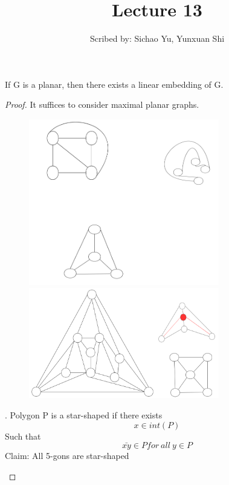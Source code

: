 \documentclass{article}
\begin{document}
  \title{Lecture 13}
  \author{Scribed by: Sichao Yu, Yunxuan Shi }
  \maketitle


  \begin{theorem}
     If G is a planar, then there exists a linear embedding of G.
  \end{theorem}
  \begin{proof}
    It suffices to consider maximal planar graphs.
  

  \begin{figure}[htp]
    \centering %
    \includegraphics[width = 8.3cm]{week8/figure/fary.jpg}
    \includegraphics[width = 8.3cm]{week8/figure/fary2.jpg}
  \end{figure}
  
  
  \begin{defination}
    . Polygon P is a star-shaped if there exists \[x\in  int(P)\] Such that \[ \bar{xy}\in P for \ all \ y \in P\]
    Claim: All 5-gons are star-shaped
   \end{defination}   
    

\end{proof}
\end{document}
